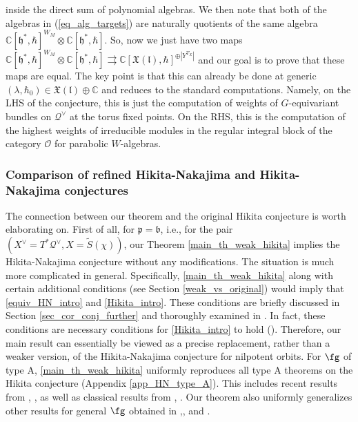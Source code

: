 \documentclass[12pt]{amsart}
\begin{document}
inside the direct sum of polynomial algebras. We then note that both of the algebras in (\ref{eq_alg_targets})  are naturally quotients of the same algebra $\mathbb{C}[\mathfrak{h}^*,\hbar]^{W_M} \otimes \mathbb{C}[\mathfrak{h}^*,\hbar]$. So, now we just have two maps $\mathbb{C}[\mathfrak{h}^*,\hbar]^{W_M} \otimes \mathbb{C}[\mathfrak{h}^*,\hbar]  \rightrightarrows \mathbb{C}[\mathfrak{X}(\mathfrak{l}),\hbar]^{\oplus |Y^{T_X}|}$ and our goal is to prove that these maps are equal. The key point is that this can already be done at generic $(\lambda,\hbar_0) \in \mathfrak{X}(\mathfrak{l}) \oplus \mathbb{C}$ and reduces to the standard computations. Namely, on the LHS of the conjecture, this is just the computation of weights of $G$-equivariant bundles on $\mathcal{Q}^\vee$ at the torus fixed points. On the RHS, this is the computation of the highest weights of irreducible modules in the regular integral block of the category $\mathcal{O}$ for parabolic $W$-algebras. 
   


\subsubsection{Comparison of refined Hikita-Nakajima and Hikita-Nakajima conjectures}    The connection between our theorem and the original Hikita conjecture is worth elaborating on. First of all, for $\mathfrak{p}=\mathfrak{b}$, i.e., for the pair $(X^\vee=T^*\mathcal{Q}^\vee, X=\widetilde{S}(\chi))$, our Theorem \ref{main_th_weak_hikita} implies the Hikita-Nakajima conjecture without any modifications. The situation is much more complicated in general.
    Specifically, \cref{main_th_weak_hikita} along with certain additional conditions (see Section \ref{weak_vs_original}) would imply that \cref{equiv_HN_intro} and \cref{Hikita_intro}. These conditions are briefly discussed in Section \ref{sec_cor_conj_further} and thoroughly examined in \cite{hoang2}. In fact, these conditions are necessary conditions for \cref{Hikita_intro} to hold (\cite[Propositions 1.1, 1.5]{hoang2}). Therefore, our main result can essentially be viewed as a precise replacement, rather than a weaker version, of the Hikita-Nakajima conjecture for nilpotent orbits. For $\fg$ of type A, \cref{main_th_weak_hikita} uniformly reproduces all type A theorems on the Hikita conjecture (Appendix \ref{app_HN_type_A}). This includes recent results from \cite{Brundan2008}, \cite{KamnitzerTingleyWebsterWeeksYacobi}, as well as classical results from \cite{deConcini1981}, \cite{Tanisaki}. Our theorem also uniformly generalizes other results for general $\fg$ obtained in \cite{carell},\cite{Kumar2012}, and \cite{Carrell_2017}.
\end{document}
